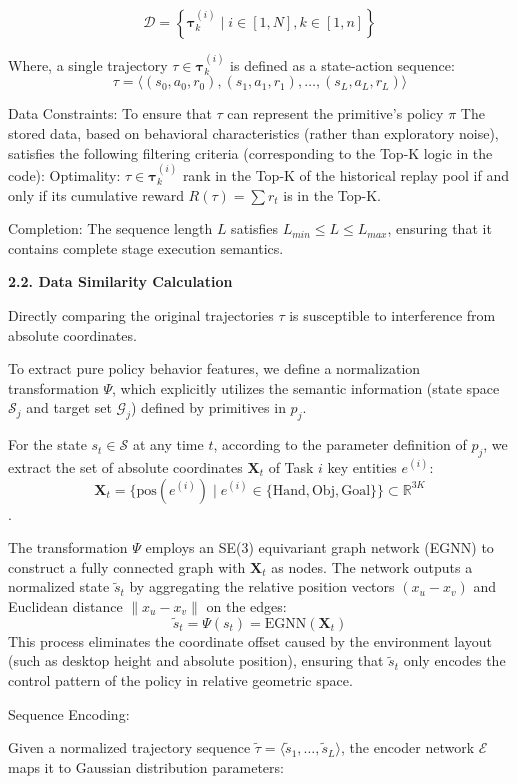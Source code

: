 \documentclass{article}
\begin{document}
$$\mathcal{D} = \left\{ \boldsymbol{\tau}^{(i)}_k \mid i \in [1, N], k \in [1, n] \right\}$$

Where, a single trajectory $\tau \in \boldsymbol{\tau}^{(i)}_k$ is defined as a state-action sequence: $$\tau = \langle (s_0, a_0, r_0), (s_1, a_1, r_1), \dots, (s_L, a_L, r_L) \rangle$$

Data Constraints: 
To ensure that $\tau$ can represent the primitive's policy $\pi$ The stored data, based on behavioral characteristics (rather than exploratory noise), satisfies the following filtering criteria (corresponding to the Top-K logic in the code): 
Optimality: $\tau \in \boldsymbol{\tau}^{(i)}_k$ rank in the Top-K of the historical replay pool if and only if its cumulative reward $R(\tau) = \sum r_t$ is in the Top-K.

Completion: The sequence length $L$ satisfies $L_{min} \leq L \leq L_{max}$, ensuring that it contains complete stage execution semantics.


\textbf{2.2. Data Similarity Calculation}

Directly comparing the original trajectories $\tau$ is susceptible to interference from absolute coordinates.

To extract pure policy behavior features, we define a normalization transformation $\Psi$, which explicitly utilizes the semantic information (state space $\mathcal{S}_j$ and target set $\mathcal{G}_j$) defined by primitives in $p_j$.

For the state $s_t \in \mathcal{S}$ at any time $t$, according to the parameter definition of $p_j$, we extract the set of absolute coordinates $\mathbf{X}_t$ of Task $i$ key entities $e^{(i)}$: 
$$\mathbf{X}_t = \{ \text{pos}(e^{(i)}) \mid e^{(i)} \in \{ \text{Hand}, \text{Obj}, \text{Goal} \} \} \subset \mathbb{R}^{3K}$$.

The transformation $\Psi$ employs an SE(3) equivariant graph network (EGNN) to construct a fully connected graph with $\mathbf{X}_t$ as nodes. 
The network outputs a normalized state $\tilde{s}_t$ by aggregating the relative position vectors $(x_u - x_v)$ and Euclidean distance $\|x_u - x_v\|$ on the edges: 
$$\tilde{s}_t = \Psi(s_t) = \text{EGNN}(\mathbf{X}_t)$$ 
This process eliminates the coordinate offset caused by the environment layout (such as desktop height and absolute position), ensuring that $\tilde{s}_t$ only encodes the control pattern of the policy in relative geometric space.

Sequence Encoding:

Given a normalized trajectory sequence $\tilde{\tau} = \langle \tilde{s}_1, \dots, \tilde{s}_L \rangle$, the encoder network $\mathcal{E}$ maps it to Gaussian distribution parameters: 
\end{document}
